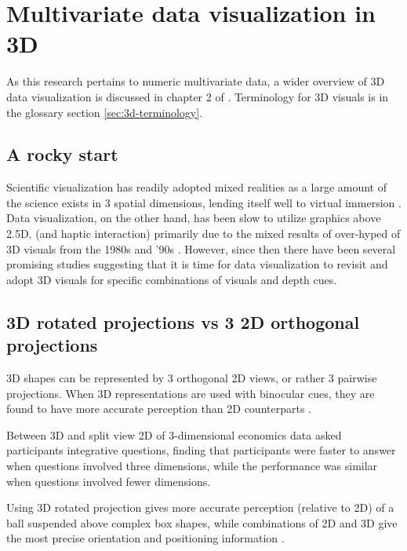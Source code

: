 \documentclass{monashthesis}
\begin{document}
\section{Multivariate data visualization in 3D}\label{sec:3d}

As this research pertains to numeric multivariate data, a wider overview
of 3D data visualization is discussed in chapter 2 of
\textcite{marriott_immersive_2018}. Terminology for 3D visuals is in the
glossary section \ref{sec:3d-terminology}.

\subsection{A rocky start}\label{a-rocky-start}

Scientific visualization has readily adopted mixed realities as a large
amount of the science exists in 3 spatial dimensions, lending itself
well to virtual immersion \autocite{marriott_immersive_2018}. Data
visualization, on the other hand, has been slow to utilize graphics
above 2.5D, (and haptic interaction) primarily due to the mixed results
of over-hyped of 3D visuals from the 1980s and '90s
\autocite{munzner_visualization_2014}. However, since then there have
been several promising studies suggesting that it is time for data
visualization to revisit and adopt 3D visuals for specific combinations
of visuals and depth cues.

\subsection{3D rotated projections vs 3 2D orthogonal
projections}\label{d-rotated-projections-vs-3-2d-orthogonal-projections}

3D shapes can be represented by 3 orthogonal 2D views, or rather 3
pairwise projections. When 3D representations are used with binocular
cues, they are found to have more accurate perception than 2D
counterparts \autocite{lee_effects_1986}.

Between 3D and split view 2D of 3-dimensional economics data
\textcite{wickens_implications_1994} asked participants integrative
questions, finding that participants were faster to answer when
questions involved three dimensions, while the performance was similar
when questions involved fewer dimensions.

Using 3D rotated projection gives more accurate perception (relative to
2D) of a ball suspended above complex box shapes, while combinations of
2D and 3D give the most precise orientation and positioning information
\autocite[depicted in figure
\ref{fig:tory06fig}]{tory_visualization_2006}.
\end{document}
